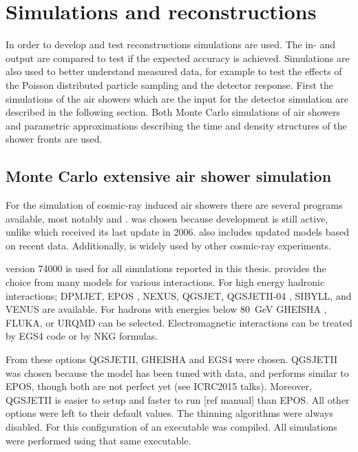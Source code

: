 \chapter{Simulations and reconstructions}
\label{ch:reconstructions}


In order to develop and test reconstructions simulations are used. The in- and output are compared to test if the expected accuracy is achieved. Simulations are also used to better understand measured data, for example to test the effects of the Poisson distributed particle sampling and the detector response. First the simulations of the air showers which are the input for the detector simulation are described in the following section. Both Monte Carlo simulations of air showers and parametric approximations describing the time and density structures of the shower fronts are used.


\section{Monte Carlo extensive air shower simulation}

For the simulation of cosmic-ray induced air showers there are several programs available, most notably \corsika and \aires \cite{sciutto1999aires}. \corsika was chosen because development is still active, unlike \aires which received its last update in 2006. \corsika also includes updated models based on recent \lhc data. Additionally, \corsika is widely used by other cosmic-ray experiments.

\corsika version 74000 is used for all simulations reported in this thesis. \corsika provides the choice from many models for various interactions. For high energy hadronic interactions; DPMJET, EPOS \lhc \cite{pierog2013epos}, NEXUS, QGSJET, QGSJETII-04 \cite{ostapchenko2013qgsjetii}, SIBYLL, and VENUS are available. For hadrons with energies below \SI{80}{\GeV} GHEISHA \cite{fesefeldt1985}, FLUKA, or URQMD can be selected. Electromagnetic interactions can be treated by EGS4 \cite{egs4} code or by NKG formulas.

From these options QGSJETII, GHEISHA and EGS4 were chosen. QGSJETII was chosen because the model has been tuned with \lhc data, and performs similar to EPOS, though both are not perfect yet (see ICRC2015 talks). Moreover, QGSJETII is easier to setup and faster to run [ref manual] than EPOS. All other options were left to their default values. The thinning algorithms were always disabled. For this configuration of \corsika an executable was compiled.  All simulations were performed using that same executable.

